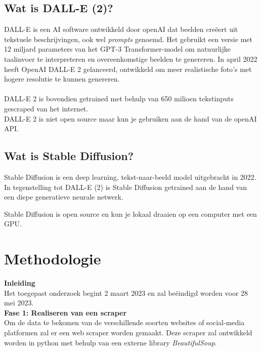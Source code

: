 \subsection{Wat is DALL-E (2)?}

\noindent
DALL-E is een AI software ontwikkeld door openAI dat beelden creëert uit tekstuele beschrijvingen, ook wel \emph{prompts} genoemd. Het gebruikt een versie met 12 miljard parameters van het GPT-3 Transformer-model om natuurlijke taalinvoer te interpreteren en overeenkomstige beelden te genereren. In april 2022 heeft OpenAI DALL-E 2 gelanceerd, ontwikkeld om meer realistische foto's met hogere resolutie te kunnen genereren. \\
 \autocite{DallEWikipediaNL}  \autocite{DallEWikipediaEN}\\

\noindent
DALL-E 2 is bovendien getrained met behulp van 650 milioen tekstinputs gescraped van het internet. \autocite{Borji2022} \\

\noindent
DALL-E 2 is niet open source maar kun je gebruiken aan de hand van de openAI API.  \\
\subsection{Wat is Stable Diffusion?}
\noindent
Stable Diffusion is een deep learning, tekst-naar-beeld model uitgebracht in 2022. In tegenstelling tot DALL-E (2) is Stable Diffusion getrained aan de hand van een diepe generatieve neurale netwerk.
\autocite{StableDifWikipediaEN}

Stable Diffusion is open source en kun je lokaal draaien op een computer met een GPU.



\section{Methodologie}%
\label{sec:methodologie}
\noindent
\textbf{Inleiding} \\
Het toegepast onderzoek begint 2 maart 2023 en zal beëindigd worden voor 28 mei 2023. \\

\noindent
\textbf{Fase 1: Realiseren van een scraper} \\
Om de data te bekomen van de verschillende soorten websites of social-media platformen zal er een web scraper worden gemaakt. Deze scraper zal ontwikkeld worden in python met behulp van een externe library \emph{BeautifulSoup}.

